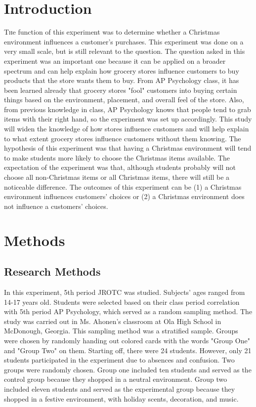 \documentclass[twoside]{article}
\begin{document}
\begin{multicols}{2} %

\section{Introduction}

\lettrine[nindent=0em,lines=3]{T}he function of this experiment was to determine whether a Christmas environment influences a customer's purchases. This experiment was done on a very small scale, but is still relevant to the question. The question asked in this experiment was an important one because it can be applied on a broader spectrum and can help explain how grocery stores influence customers to buy products that the store wants them to buy. From AP Psychology class, it has been learned already that grocery stores "fool" customers into buying certain things based on the environment, placement, and overall feel of the store. Also, from previous knowledge in class, AP Psychology knows that people tend to grab items with their right hand, so the experiment was set up accordingly. This study will widen the knowledge of how stores influence customers and will help explain to what extent grocery stores influence customers without them knowing. The hypothesis of this experiment was that having a Christmas environment will tend to make students more likely to choose the Christmas items available. The expectation of the experiment was that, although students probably will not choose all non-Christmas items or all Christmas items, there will still be a noticeable difference. The outcomes of this experiment can be (1) a Christmas environment influences customers' choices or (2) a Christmas environment does not influence a customers' choices.



\section{Methods}
\subsection{Research Methods}
In this experiment, 5th period JROTC was studied. Subjects' ages ranged from 14-17 years old. Students were selected based on their class period correlation with 5th period AP Psychology, which served as a random sampling method.  The study was carried out in Ms. Ahonen's classroom at Ola High School in McDonough, Georgia. This sampling method was a stratified sample. Groups were chosen by randomly handing out colored cards with the words "Group One" and "Group Two" on them. Starting off, there were 24 students. However, only 21 students participated in the experiment due to absences and confusion. Two groups were randomly chosen. Group one included ten students and served as the control group because they shopped in a neutral environment. Group two included eleven students and served as the experimental group because they shopped in a festive environment, with holiday scents, decoration, and music. 

\end{multicols}
\end{document}
